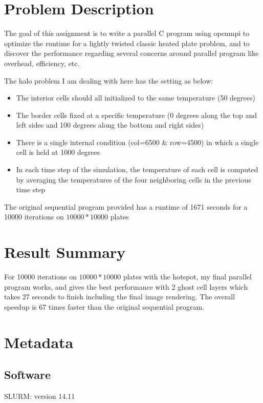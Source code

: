 \documentclass{cs4444}
\begin{document}
\maketitle

\section{Problem Description}
The goal of this assignment is to write a parallel C program using openmpi to optimize the runtime for a lightly twisted classic heated plate problem, and to discover the performance regarding several concerns around parallel program like overhead, efficiency, etc. 

The halo problem I am dealing with here has the setting as below:
	\begin{itemize}
	\item The interior cells should all initialized to the same temperature (50 degrees)
	\item The border cells fixed at a specific temperature (0 degrees along the top and left sides and 100 degrees along the bottom and right sides)
	\item There is a single internal condition (col=6500 \& row=4500) in which a single cell is held at 1000 degrees
	\item  In each time step of the simulation, the temperature of each cell is computed by averaging the temperatures of the four neighboring cells in the previous time step
	\end{itemize}
	
The original sequential program provided has a runtime of 1671 seconds for a 10000 iterations on $10000 * 10000$ plates

\section{Result Summary}
For 10000 iterations on $10000 * 10000$ plates with the hotspot, my final parallel program works, and gives the best performance with 2 ghost cell layers which takes 27 seconds to finish including the final image rendering. The overall speedup is 67 times faster than the original sequential program.

\section{Metadata}
\subsection{Software}
	SLURM: version 14.11
	
\end{document}
